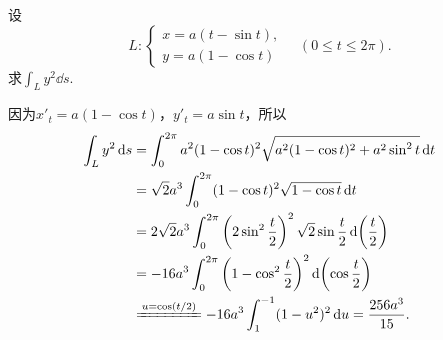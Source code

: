 \begin{example}
设\[
L: \left\{ \begin{array}{l}
x = a(t - \sin t), \\
y = a(1 - \cos t)
\end{array} \right.
\quad(0 \leq t \leq 2\pi).
\]求\(\int_L y^2 \dd{s}\).
\begin{solution}
因为\(x'_t = a(1 - \cos t)\)，\(y'_t = a \sin t\)，所以\begin{align*}
\int_L y^2 \dd{s}
&= \int_0^{2\pi} a^2(1 - \cos t)^2 \sqrt{a^2(1 - \cos t)^2 + a^2 \sin^2 t} \dd{t} \\
&= \sqrt{2} a^3 \int_0^{2\pi} (1 - \cos t)^2 \sqrt{1 - \cos t} \dd{t} \\
&= 2\sqrt{2} a^3 \int_0^{2\pi}
 \left(2 \sin^2 \frac{t}{2}\right)^2 \sqrt{2} \sin\frac{t}{2} \dd(\frac{t}{2}) \\
&= -16 a^3 \int_0^{2\pi} \left(1 - \cos^2 \frac{t}{2}\right)^2 \dd(\cos\frac{t}{2}) \\
&\xlongequal{u=\cos(t/2)}
-16a^3 \int_1^{-1} (1-u^2)^2 \dd{u}
= \frac{256a^3}{15}.
\end{align*}
\end{solution}
\end{example}
